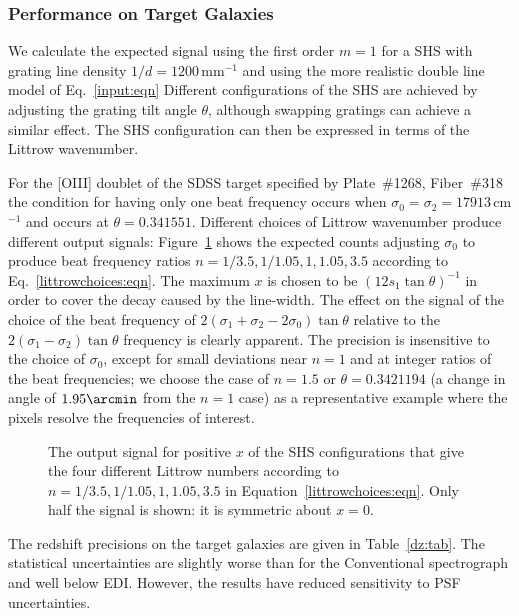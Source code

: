 \documentclass[preprint2, 10pt]{aastex}
\begin{document}
\subsubsection{Performance on Target Galaxies}

We calculate the expected signal using the first order $m=1$ for a SHS with grating line density $1/d=1200$\,mm$^{-1}$
and using the more realistic double line model of Eq.~\ref{input:eqn}
Different configurations of the SHS are achieved by adjusting the grating tilt angle $\theta$, although swapping
gratings can achieve a similar effect.
The SHS configuration can then be expressed in terms of the Littrow wavenumber.

For the [OIII] doublet of the
SDSS target specified by Plate~\#1268, Fiber~\#318 
the condition for having only one beat frequency occurs when $\sigma_0=\sigma_2=17913$\,cm$^{-1}$ and
occurs at $\theta=0.341551$.
Different choices of Littrow wavenumber
produce different output signals:
Figure~\ref{shscounts:fig} shows the expected counts adjusting $\sigma_0$ to produce beat frequency ratios
$n=1/3.5,1/1.05,1,1.05,3.5$ according to Eq.\ \ref{littrowchoices:eqn}.
The maximum $x$ is chosen to be $(12s_1\tan{\theta})^{-1}$ in order to cover the decay caused by the line-width.
The effect on the signal
of the choice of the beat frequency of $2(\sigma_1+\sigma_2-2\sigma_0)\tan{\theta}$ relative to the $2(\sigma_1-\sigma_2)\tan{\theta}$ frequency
is clearly apparent.
The precision is insensitive to the choice of $\sigma_0$, except
for small deviations near $n=1$ and at integer ratios of the beat frequencies; we choose
the case of $n=1.5$ or $\theta = 0.3421194$ (a change in angle of $1.95 \arcmin$ from the $n=1$ case)
as a representative example where the pixels resolve the frequencies of interest.

\begin{figure}[t]
   \centering
   \caption{The output signal for positive $x$ of the  SHS configurations that give the four different
   Littrow numbers according to
   $n=1/3.5,1/1.05,1,1.05,3.5$  in Equation~\ref{littrowchoices:eqn}. Only half the signal is shown: it is
   symmetric about $x=0$.\label{shscounts:fig}}
\end{figure}

The redshift precisions on the target galaxies are given in Table~\ref{dz:tab}.  The statistical uncertainties are slightly worse than for
the Conventional spectrograph and well below EDI.  However, the results have reduced sensitivity to PSF uncertainties.
\end{document}
